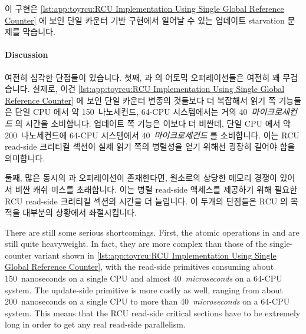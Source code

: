 이 구현은
\cref{lst:app:toyrcu:RCU Implementation Using Single Global Reference Counter}
에 보인 단일 카운터 기반 구현에서 일어날 수 있는 업데이트 starvation 문제를
막습니다.

\iffalse

This implementation avoids the update-starvation issues that could
occur in the single-counter implementation shown in
\cref{lst:app:toyrcu:RCU Implementation Using Single Global Reference Counter}.

\fi

\paragraph{Discussion}

여전히 심각한 단점들이 있습니다.
첫째,  과  의 어토믹 오퍼레이션들은
여전히 꽤 무겁습니다.
실제로, 이건
\cref{lst:app:toyrcu:RCU Implementation Using Single Global Reference Counter}
에 보인 단일 카운터 변종의 것들보다 더 복잡해서 읽기 쪽 기능들은 단일 
CPU 에서 약 150~나노세컨드, 64-CPU 시스템에서는 거의 40~\emph{마이크로세컨드}
의 시간을 소비합니다.
업데이트 쪽  기능은 이보다 더 비싼데, 단일  CPU
에서 약 200~나노세컨드에 64-CPU 시스템에서 40~\emph{마이크로세컨드} 를
소비합니다.
이는 RCU read-side 크리티컬 섹션이 실제 읽기 쪽의 병렬성을 얻기 위해선 굉장히
길어야 함을 의미합니다.

둘째, 많은 동시의  과  오퍼레이션이
존재한다면,  원소로의 상당한 메모리 경쟁이 있어서 비싼 캐쉬
미스를 초래합니다.
이는 병렬 read-side 액세스를 제공하기 위해 필요한 RCU read-side 크리티컬 섹션의
시간을 더 늘립니다.
이 두개의 단점들은 RCU 의 목적을 대부분의 상황에서 좌절시킵니다.

\iffalse

There are still some serious shortcomings.
First, the atomic operations in 
and 
are still quite heavyweight.
In fact, they are more complex than those
of the single-counter variant shown in
\cref{lst:app:toyrcu:RCU Implementation Using Single Global Reference Counter},
with the read-side primitives consuming about 150~nanoseconds on a single
 CPU and almost 40~\emph{microseconds} on a 64-CPU system.
The update-side  primitive is more costly as
well, ranging from about 200~nanoseconds on a single  CPU to
more than 40~\emph{microseconds} on a 64-CPU system.
This means that the RCU read-side critical sections
have to be extremely long in order to get any real
read-side parallelism.

